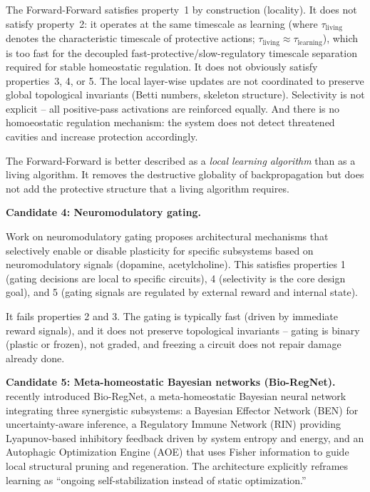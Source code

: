 \documentclass{article}
\begin{document}
The Forward-Forward satisfies property~1 by construction (locality). It does not satisfy property~2: it operates at the same timescale as learning (where $\tau_{\text{living}}$ denotes the characteristic timescale of protective actions; $\tau_{\text{living}} \approx \tau_{\text{learning}}$), which is too fast for the decoupled fast-protective/slow-regulatory timescale separation required for stable homeostatic regulation. It does not obviously satisfy properties~3, 4, or 5. The local layer-wise updates are not coordinated to preserve global topological invariants (Betti numbers, skeleton structure). Selectivity is not explicit -- all positive-pass activations are reinforced equally. And there is no homoeostatic regulation mechanism: the system does not detect threatened cavities and increase protection accordingly.

The Forward-Forward is better described as a \emph{local learning algorithm} than as a living algorithm. It removes the destructive globality of backpropagation but does not add the protective structure that a living algorithm requires.

\medskip
\noindent\textbf{Candidate 4: Neuromodulatory gating.}

Work on neuromodulatory gating \citep{Miconi2018differentiable, Beaulieu2020learning} proposes architectural mechanisms that selectively enable or disable plasticity for specific subsystems based on neuromodulatory signals (dopamine, acetylcholine). This satisfies properties 1 (gating decisions are local to specific circuits), 4 (selectivity is the core design goal), and 5 (gating signals are regulated by external reward and internal state).

It fails properties 2 and 3. The gating is typically fast (driven by immediate reward signals), and it does not preserve topological invariants -- gating is binary (plastic or frozen), not graded, and freezing a circuit does not repair damage already done.

\medskip
\noindent\textbf{Candidate 5: Meta-homeostatic Bayesian networks (Bio-RegNet).}
\citet{Ma2026bioregnet} recently introduced Bio-RegNet, a meta-homeostatic Bayesian neural network integrating three synergistic subsystems: a Bayesian Effector Network (BEN) for uncertainty-aware inference, a Regulatory Immune Network (RIN) providing Lyapunov-based inhibitory feedback driven by system entropy and energy, and an Autophagic Optimization Engine (AOE) that uses Fisher information to guide local structural pruning and regeneration. The architecture explicitly reframes learning as ``ongoing self-stabilization instead of static optimization.''
\end{document}
